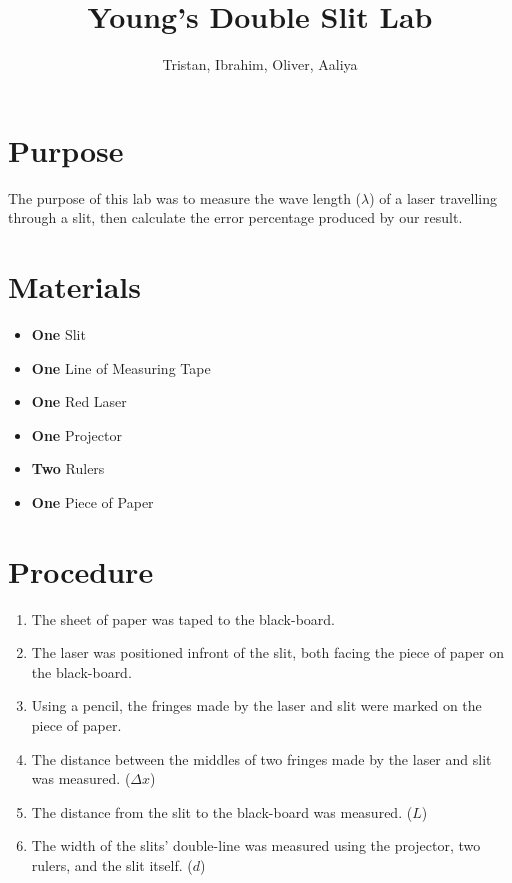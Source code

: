 \documentclass{article}
\title{Young's Double Slit Lab}
\author{Tristan, Ibrahim, Oliver, Aaliya}
\begin{document}
\maketitle
\section*{Purpose} {
  The purpose of this lab was to measure the wave length ($\lambda$) of a laser travelling through a slit, then calculate the error percentage produced by our result.
 }
\section*{Materials} {
  \begin{itemize}
      \item {\textbf{One} Slit}
      \item {\textbf{One} Line of Measuring Tape}
      \item {\textbf{One} Red Laser}
      \item {\textbf{One} Projector}
      \item {\textbf{Two} Rulers}
      \item {\textbf{One} Piece of Paper}
  \end{itemize}\leavevmode
 }
\section*{Procedure} {
  \begin{enumerate}
      \item {The sheet of paper was taped to the black-board.}
      \item {The laser was positioned infront of the slit, both facing the piece of paper on the black-board.}
      \item {Using a pencil, the fringes made by the laser and slit were marked on the piece of paper.}
      \item {The distance between the middles of two fringes made by the laser and slit was measured. ($\Delta x$)}
      \item {The distance from the slit to the black-board was measured. ($L$)}
      \item {The width of the slits' double-line was measured using the projector, two rulers, and the slit itself. ($d$)}
  \end{enumerate}\leavevmode
 }
\end{document}
